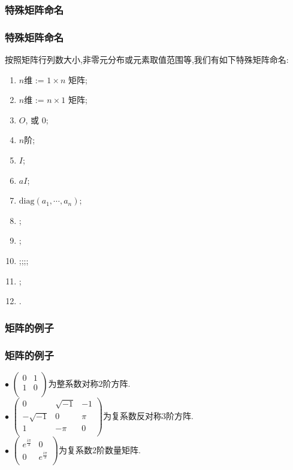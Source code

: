 \subsubsection{特殊矩阵命名}
\begin{frame}\frametitle{特殊矩阵命名}
按照矩阵行列数大小,非零元分布或元素取值范围等,我们有如下特殊矩阵命名:
\pp
\begin{enumerate}
\item $n$维 := $1\times n$ 矩阵; \pp
\item $n$维 := $n\times 1$ 矩阵; \pp
\item {} $O$, 或 $0$; \pp
\item $n$阶; \pp
\item {} $I$; \pp
\item {} $aI$; \pp
\item {} $\mathrm{diag}(a_1,\cdots,a_n)$; \pp
\item {}; \pp
\item {}; \pp
\item {};;;; \pp
\item {}; \pp
\item {}.
\end{enumerate}
\end{frame}





\subsubsection{矩阵的例子}
\begin{frame}\frametitle{矩阵的例子}
\begin{example}
$\bullet$ $\begin{pmatrix}0&1\\1&0\\\end{pmatrix}$为整系数对称$2$阶方阵.\\ \pp
$\bullet$ $\begin{pmatrix}0&\sqrt{-1}&-1\\-\sqrt{-1}&0&\pi\\1&-\pi&0\\\end{pmatrix}$为复系数反对称$3$阶方阵.
\\ \pp
$\bullet$ $\begin{pmatrix}e^{\frac{i\pi}{3}}&0\\0&e^{\frac{i\pi}{3}}\\\end{pmatrix}$为复系数2阶数量矩阵.


\end{example}\end{frame}





